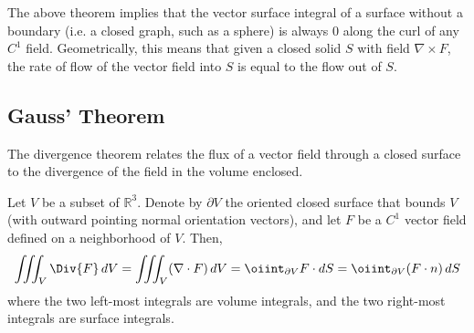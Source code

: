   The above theorem implies that the vector surface integral of a surface without a boundary (i.e. a closed graph, such as a sphere) is always $0$ along the curl of any $C^1$ field. Geometrically, this means that given a closed solid $S$ with field $\nabla \times F$, the rate of flow of the vector field into $S$ is equal to the flow out of $S$. 
		
\subsection{Gauss' Theorem}
		
  The divergence theorem relates the flux of a vector field through a closed surface to the divergence of the field in the volume enclosed. 
		
  \begin{theorem}
		Let $V$ be a subset of $\mathbb{R}^3$. Denote by $\partial V$ the oriented closed surface that bounds $V$ (with outward pointing normal orientation vectors), and let $F$ be a $C^1$ vector field defined on a neighborhood of $V$. Then, 
		\begin{equation}
			\iiint_V \Div{F} \, d V = \iiint_V (\nabla \cdot F) \, d V = \oiint_{\partial V} F \cdot d S = \oiint_{\partial V} (F \cdot n) \, dS
		\end{equation}
		where the two left-most integrals are volume integrals, and the two right-most integrals are surface integrals. 
		
		\begin{figure}[H]
			\centering 
\end{figure}
\end{theorem}
